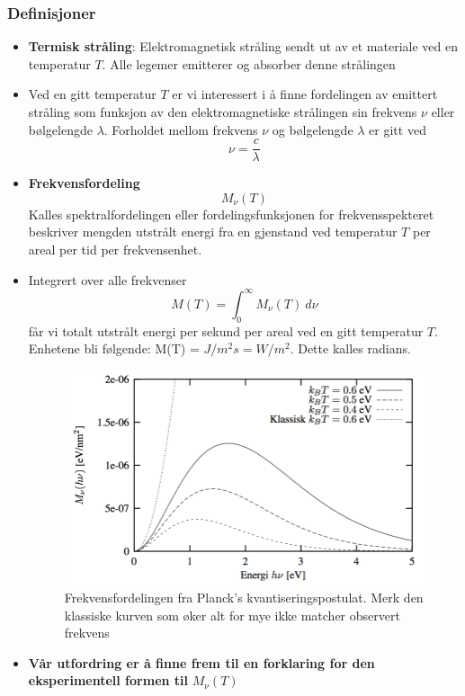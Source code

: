 \subsubsection*{Definisjoner}
\begin{itemize}
    \item \textbf{Termisk stråling}: Elektromagnetisk stråling sendt ut av et materiale ved en temperatur $T$. Alle legemer emitterer og absorber denne strålingen
    \item Ved en gitt temperatur $T$ er vi interessert i å finne fordelingen av emittert stråling som funksjon av den elektromagnetiske strålingen sin frekvens $ν$ eller bølgelengde $λ$. Forholdet mellom frekvens $ν$ og bølgelengde $λ$ er gitt ved
    \begin{equation}
    ν = \frac{c}{λ}
    \end{equation}
    
    \item \textbf{Frekvensfordeling}
    \begin{equation}
    M_{ν}(T)
    \end{equation}
    Kalles spektralfordelingen eller fordelingsfunksjonen for frekvensspekteret beskriver mengden utstrålt energi fra en gjenstand ved temperatur $ T $ per areal per tid per frekvensenhet. 
    
    \item Integrert over alle frekvenser 
    \begin{equation}
    M(T) = \int_{0}^{\infty} M_{ν}(T) \ dν
    \end{equation}
    får vi totalt utstrålt energi per sekund per areal ved en gitt temperatur $ T $. Enhetene bli følgende: M(T) = $ J / m^{2}s = W / m^{2} $. Dette kalles radians. 
    
    \begin{figure}[h!]
        \centering
        \includegraphics[scale = .5]{Figures/Frekvensfordeling kvantiserinspostulat.png}
        \caption{Frekvensfordelingen fra Planck's kvantiseringspostulat. Merk den klassiske kurven som øker alt for mye ikke matcher observert frekvens}
        \label{fig: Frekvensfordeling kvantiserinspostulat}
    \end{figure}
    
    \item \textbf{Vår utfordring er å finne frem til en forklaring for den eksperimentell formen til} $M_{ν}(T)$
\end{itemize}

